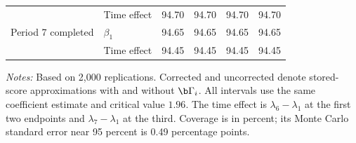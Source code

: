 \begin{table}[H]
\begin{tabular}{@{}llrrrr@{}}
 & Time effect & 94.70 & 94.70 & 94.70 & 94.70 \\
Period 7 completed & $\beta_1$ & 94.65 & 94.65 & 94.65 & 94.65 \\
 & Time effect & 94.45 & 94.45 & 94.45 & 94.45 \\
\bottomrule
\end{tabular}
\par\vspace{4pt}
\begin{minipage}{0.96\textwidth}
\footnotesize{}\raggedright
\textit{Notes:} Based on 2,000 replications. Corrected and uncorrected denote stored-score approximations with and without $\b\Gamma_i$. All intervals use the same coefficient estimate and critical value $1.96$. The time effect is $\lambda_6-\lambda_1$ at the first two endpoints and $\lambda_7-\lambda_1$ at the third. Coverage is in percent; its Monte Carlo standard error near 95 percent is 0.49 percentage points.
\end{minipage}
\end{table}
